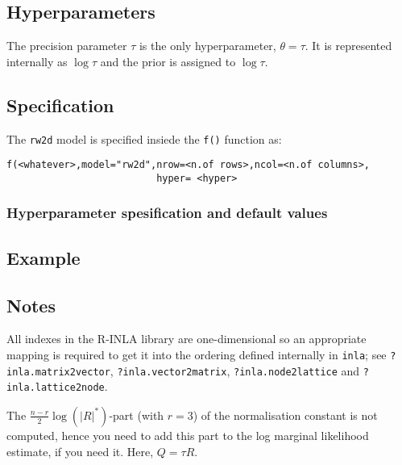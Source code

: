 \documentclass[a4paper,11pt]{article}
\begin{document}
\subsection*{Hyperparameters}

The precision parameter $\tau$ is the only hyperparameter, $\theta =
\tau$. It is represented internally as $\log\tau$ and the prior is
assigned to $\log\tau$.

\subsection*{Specification}

The {\tt rw2d} model is specified insiede the {\tt f()} function as:
\begin{verbatim}
f(<whatever>,model="rw2d",nrow=<n.of rows>,ncol=<n.of columns>,
                          hyper= <hyper>
\end{verbatim}

\subsubsection*{Hyperparameter spesification and default values}


\subsection*{Example}



\subsection*{Notes}
All indexes in the R-INLA library are one-dimensional so an
appropriate mapping is required to get it into the ordering defined
internally in \verb|inla|; see \verb|?inla.matrix2vector|,
\verb|?inla.vector2matrix|, \verb|?inla.node2lattice| and
\verb|?inla.lattice2node|.


The $\frac{n-r}{2}\log(|R|^{*})$-part (with $r=3$) of the
normalisation constant is not computed, hence you need to add this
part to the log marginal likelihood estimate, if you need it. Here,
$Q=\tau R$. 


{\small}
\end{document}
